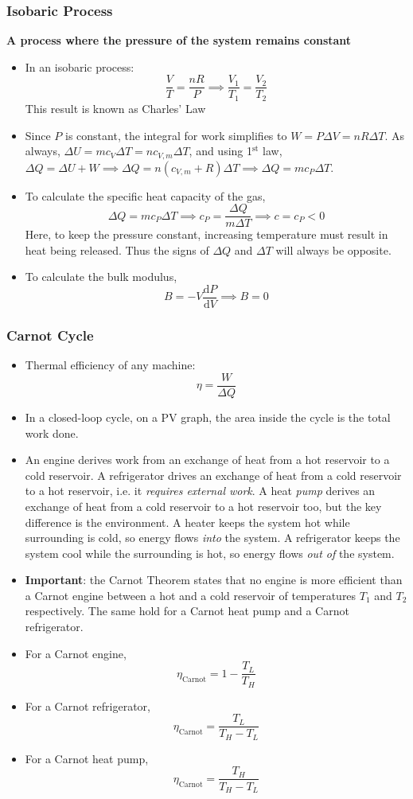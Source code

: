 \documentclass{scrartcl}
\begin{document}
    \subsubsection{Isobaric Process}
    \quad \textbf{A process where the pressure of the system remains constant}
    \begin{itemize}
        \item In an isobaric process: \[\frac VT=\frac{nR}P\implies\frac{V_1}{T_1}=\frac{V_2}{T_2}\] This result is known as Charles' Law
        \item Since $P$ is constant, the integral for work simplifies to $W=P\Delta V=nR\Delta T$. As always, $\Delta U=mc_V\Delta T=nc_{V,m}\Delta T$, and using 1$^\text{st}$ law, $\Delta Q=\Delta U+W\implies\Delta Q=n\left(c_{V,m}+R\right)\Delta T\implies\Delta Q=mc_P\Delta T$.
        \item To calculate the specific heat capacity of the gas, \[\Delta Q=mc_P\Delta T\implies c_P=\frac{\Delta Q}{m\Delta T}\implies\boxed{c=c_P<0}\] Here, to keep the pressure constant, increasing temperature must result in heat being released. Thus the signs of $\Delta Q$ and $\Delta T$ will always be opposite.
        \item To calculate the bulk modulus, \[B=-V\frac{\mathrm dP}{\mathrm dV}\implies \boxed{B=0}\]
    \end{itemize}
    \subsubsection{Carnot Cycle}
    \begin{itemize}
        \item Thermal efficiency of any machine: \[\eta=\frac W{\Delta Q}\]
        \item In a closed-loop cycle, on a PV graph, the area inside the cycle is the total work done.
        \item An engine derives work from an exchange of heat from a hot reservoir to a cold reservoir. A refrigerator drives an exchange of heat from a cold reservoir to a hot reservoir, i.e. it \textit{requires external work}. A heat \textit{pump} derives an exchange of heat from a cold reservoir to a hot reservoir too, but the key difference is the environment. A heater keeps the system hot while surrounding is cold, so energy flows \textit{into} the system. A refrigerator keeps the system cool while the surrounding is hot, so energy flows \textit{out of} the system.
        \item \textbf{Important}: the Carnot Theorem states that no engine is more efficient than a Carnot engine between a hot and a cold reservoir of temperatures $T_1$ and $T_2$  respectively. The same hold for a Carnot heat pump and a Carnot refrigerator.
        \item For a Carnot engine, \[\eta_\text{Carnot}=1-\frac{T_L}{T_H}\]
        \item For a Carnot refrigerator, \[\eta_\text{Carnot}=\frac{T_L}{T_H-T_L}\]
        \item For a Carnot heat pump, \[\eta_\text{Carnot}=\frac{T_H}{T_H-T_L}\]
    \end{itemize}
\end{document}
